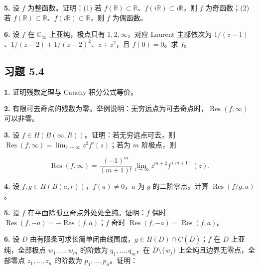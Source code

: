 \documentclass[11pt,a4paper]{article}
\begin{document}
\par{}
\noindent\textbf{5.} 设 \(f\) 为整函数。证明：(1) 若
\(f(\mathbb R)\subset\mathbb R\)、\(f(i\mathbb R)\subset i\mathbb R\)，则
\(f\) 为奇函数；(2) 若
\(f(\mathbb R)\subset\mathbb R\)、\(f(i\mathbb R)\subset\mathbb R\)，则
\(f\) 为偶函数。

\par{}
\noindent\textbf{6.} 设 \(f\) 在 \(\mathbb C_\infty\) 上亚纯，极点只有
\(1,2,\infty\)，对应 Laurent 主部依次为
\(1/(z-1)\)、\(1/(z-2)+1/(z-2)^2\)、\(z+z^2\)，且 \(f(0)=0\)。求 \(f\)。

\subsection{习题 5.4}\label{ch05-practice-heading-4}

\par{}
\noindent\textbf{1.} 证明残数定理与 Cauchy 积分公式等价。

\par{}
\noindent\textbf{2.}
有限可去奇点的残数为零。举例说明：无穷远点为可去奇点时，\(\operatorname{Res}(f,\infty)\)
可以非零。

\par{}
\noindent\textbf{3.} 设 \(f\in H(B(\infty,R))\)。证明：若无穷远点可去，则
\(\operatorname{Res}(f,\infty)=\lim_{z\to\infty}z^2f'(z)\)；若为 \(m\)
阶极点，则

\[
\operatorname{Res}(f,\infty)=\frac{(-1)^m}{(m+1)!}\lim_{z\to\infty}z^{m+2}f^{(m+1)}(z).
\]

\par{}
\noindent\textbf{4.} 设 \(f,g\in H(B(a,r))\)，\(f(a)\ne0\)，\(a\) 为 \(g\)
的二阶零点。计算 \(\operatorname{Res}(f/g,a)\)。

\par{}
\noindent\textbf{5.} 设 \(f\) 在平面除孤立奇点外处处全纯。证明：\(f\) 偶时
\(\operatorname{Res}(f,-a)=-\operatorname{Res}(f,a)\)；\(f\) 奇时
\(\operatorname{Res}(f,-a)=\operatorname{Res}(f,a)\)。

\par{}
\noindent\textbf{6.} 设 \(D\)
由有限条可求长简单闭曲线围成，\(g\in H(D)\cap C(\overline D)\)；\(f\) 在
\(D\) 上亚纯，全部极点 \(w_1,\ldots,w_m\) 的阶数为
\(q_1,\ldots,q_m\)，在 \(\overline D\setminus\{w_j\}\)
上全纯且边界无零点，全部零点 \(z_1,\ldots,z_n\) 的阶数为
\(p_1,\ldots,p_n\)。证明：
\end{document}
